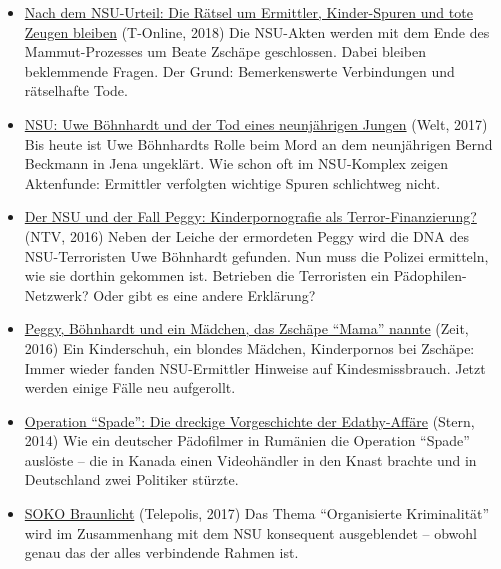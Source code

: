 \begin{itemize}
\tightlist
\item
  \href{https://www.t-online.de/nachrichten/deutschland/id_84098542/nsu-prozess-die-raetsel-um-tote-zeugen-und-kinder-spuren-bleiben.html}{Nach
  dem NSU-Urteil: Die Rätsel um Ermittler, Kinder-Spuren und tote Zeugen
  bleiben} (T-Online, 2018) Die NSU-Akten werden mit dem Ende des
  Mammut-Prozesses um Beate Zschäpe geschlossen. Dabei bleiben
  beklemmende Fragen. Der Grund: Bemerkenswerte Verbindungen und
  rätselhafte Tode.
\item
  \href{https://www.welt.de/politik/deutschland/article161794453/Uwe-Boehnhardt-und-der-Tod-eines-neunjaehrigen-Jungen.html}{NSU:
  Uwe Böhnhardt und der Tod eines neunjährigen Jungen} (Welt, 2017) Bis
  heute ist Uwe Böhnhardts Rolle beim Mord an dem neunjährigen Bernd
  Beckmann in Jena ungeklärt. Wie schon oft im NSU-Komplex zeigen
  Aktenfunde: Ermittler verfolgten wichtige Spuren schlichtweg nicht.
\item
  \href{https://www.n-tv.de/politik/Kinderpornografie-als-Terror-Finanzierung-article18857306.html}{Der
  NSU und der Fall Peggy: Kinderpornografie als Terror-Finanzierung?}
  (NTV, 2016) Neben der Leiche der ermordeten Peggy wird die DNA des
  NSU-Terroristen Uwe Böhnhardt gefunden. Nun muss die Polizei
  ermitteln, wie sie dorthin gekommen ist. Betrieben die Terroristen ein
  Pädophilen-Netzwerk? Oder gibt es eine andere Erklärung?
\item
  \href{https://www.zeit.de/gesellschaft/zeitgeschehen/2016-10/nsu-kindesmissbrauch-paedophilie-morde-dna-uwe-boehnhardt}{Peggy,
  Böhnhardt und ein Mädchen, das Zschäpe ``Mama'' nannte} (Zeit, 2016)
  Ein Kinderschuh, ein blondes Mädchen, Kinderpornos bei Zschäpe: Immer
  wieder fanden NSU-Ermittler Hinweise auf Kindesmissbrauch. Jetzt
  werden einige Fälle neu aufgerollt.
\item
  \href{https://www.stern.de/politik/deutschland/operation--spade--die-dreckige-vorgeschichte-der-edathy-affaere-3404622.html}{Operation
  ``Spade'': Die dreckige Vorgeschichte der Edathy-Affäre} (Stern, 2014)
  Wie ein deutscher Pädofilmer in Rumänien die Operation ``Spade''
  auslöste -- die in Kanada einen Videohändler in den Knast brachte und
  in Deutschland zwei Politiker stürzte.
\item
  \href{https://www.heise.de/tp/features/SOKO-Braunlicht-3879889.html?seite=all}{SOKO
  Braunlicht} (Telepolis, 2017) Das Thema ``Organisierte Kriminalität''
  wird im Zusammenhang mit dem NSU konsequent ausgeblendet -- obwohl
  genau das der alles verbindende Rahmen ist.
\end{itemize}

